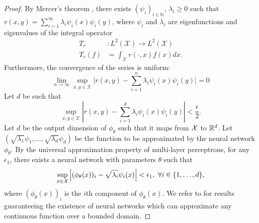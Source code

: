 \begin{proof}
	\hphantom{~}

	By Mercer's theorem \parencite{mercerFunctionsPositive1909, sunMercerTheorem2005, micchelliUniversalKernels2006}, there exists \((\psi_i)_{i \in \mathbb{N}}\), \(\lambda_i \geq 0\) such that \(r(x,y) = \sum_{i=1}^{\infty}{\lambda_i \psi_i(x) \psi_i(y)}\), where \(\psi_i\) and \(\lambda_i\) are eigenfunctions and eigenvalues of the integral operator
	\begin{align*}
		T_r&: L^2(\mathcal{X}) \to L^2(\mathcal{X}) \\
		T_r(f) &= \int_{\mathcal{X}}{r(\cdot, x) f(x) dx}.
	\end{align*}
	Furthermore, the convergence of the series is uniform:
	\begin{equation}
		\lim_{n \to \infty} \sup_{x,y \in \mathcal{X}} \lvert r(x,y) - \sum_{i=1}^{n}{\lambda_i \psi_i(x) \psi_i(y) \rvert} = 0
	\end{equation}
	Let \(d\) be such that
	\begin{equation}
		\label{eq:proof_mercer_thm_unif_abs_cv}
		\sup_{x,y \in \mathcal{X}} \left\lvert r(x,y) - \sum_{i=1}^{d}{\lambda_i \psi_i(x) \psi_i(y)} \right\rvert < \frac{\epsilon}{2}.
	\end{equation}
	Let $d$ be the output dimension of \(\phi_\theta\) such that it maps from ${\mathcal{X}}$ to $\mathbb{R}^d$. Let \((\sqrt{\lambda_1} \psi_1, \ldots, \sqrt{\lambda_{d}} \psi_{d})\) be the function to be approximated by the neural network \(\phi_\theta\). By the universal approximation property of multi-layer perceptrons, for any \(\epsilon_1\), there exists a neural network with parameters \(\theta\) such that
	\begin{equation}
		\label{eq:proof_NN_UAP}
		\sup_{x\in \mathcal{X}}{\left\lvert(\phi_\theta(x))_i - \sqrt{\lambda_i} \psi_i(x)\right\rvert} < \epsilon_1, \ \forall i \in \{1, \ldots, d\},
	\end{equation}
	where $(\phi_\theta(x))_i$ is the \(i\)th component of $\phi_\theta(x)$. We refer to \parencite{hornikMultilayerFeedforward1989, cybenkoApproximationSuperpositions1989, barronUniversalApproximation1993} for results guaranteeing the existence of neural networks which can approximate any continuous function over a bounded domain.


\end{proof}
